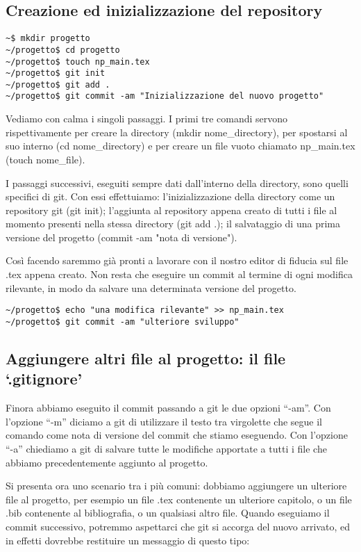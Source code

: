 \documentclass[a4paper,12pt,oneside]{article}
\begin{document}
\subsection{Creazione ed inizializzazione del repository}
\begin{lstlisting}
~$ mkdir progetto
~/progetto$ cd progetto
~/progetto$ touch np_main.tex
~/progetto$ git init
~/progetto$ git add .
~/progetto$ git commit -am "Inizializzazione del nuovo progetto"
\end{lstlisting}

Vediamo con calma i singoli passaggi. I primi tre comandi servono
rispettivamente per creare la directory (mkdir nome\_directory), per spostarsi
al suo interno (cd nome\_directory) e per creare un file vuoto chiamato
np\_main.tex (touch nome\_file).

I passaggi successivi, eseguiti sempre dati dall'interno della directory, sono
quelli specifici di git. Con essi effettuiamo:
l'inizializzazione della directory come un repository git (git init); l'aggiunta
al repository appena creato di tutti i file al momento presenti nella stessa
directory (git add .); il salvataggio di una prima versione del progetto (commit
-am "nota di versione").

Così facendo saremmo già pronti a lavorare con il nostro editor di fiducia sul
file .tex appena creato.
Non resta che eseguire un commit al termine di ogni modifica rilevante, in
modo da salvare una determinata versione del progetto.

\begin{lstlisting}
~/progetto$ echo "una modifica rilevante" >> np_main.tex
~/progetto$ git commit -am "ulteriore sviluppo"
\end{lstlisting}

\bigskip
\subsection{Aggiungere altri file al progetto: il file `.gitignore'}
Finora abbiamo eseguito il commit passando a git le due opzioni ``-am''. Con
l'opzione ``-m'' diciamo a git di utilizzare il testo tra virgolette che segue
il comando come nota di versione del commit che stiamo eseguendo. Con l'opzione
``-a'' chiediamo a git di salvare tutte le modifiche apportate a tutti i file
che abbiamo precedentemente aggiunto al progetto.

Si presenta ora uno scenario tra i più comuni: dobbiamo aggiungere un ulteriore
file al progetto, per esempio un file .tex contenente un ulteriore capitolo, o
un file .bib contenente al bibliografia, o un qualsiasi altro file.
Quando eseguiamo il commit successivo, potremmo aspettarci che git si accorga
del nuovo arrivato, ed in effetti dovrebbe restituire un messaggio di questo
tipo:
\end{document}
